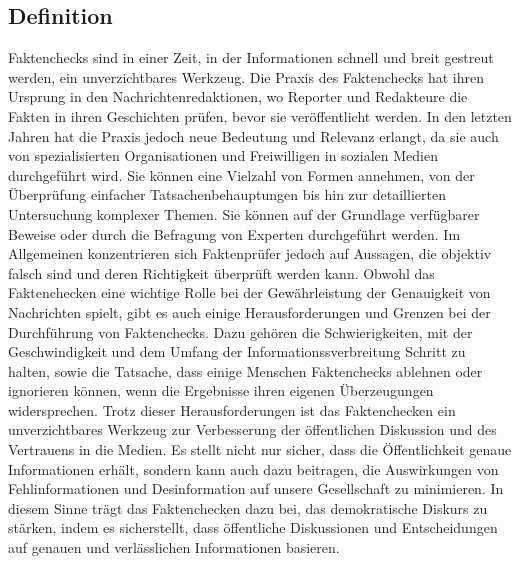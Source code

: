 \documentclass[a4paper,listof=totoc,bibliography=totoc]{scrartcl}
\begin{document}
\subsection{Definition} 
Faktenchecks sind in einer Zeit, in der Informationen schnell und breit gestreut werden, 
ein unverzichtbares Werkzeug. Die Praxis des Faktenchecks hat ihren Ursprung 
in den Nachrichtenredaktionen, wo Reporter und Redakteure die Fakten in ihren Geschichten 
prüfen, bevor sie veröffentlicht werden. In den letzten Jahren hat die Praxis jedoch neue 
Bedeutung und Relevanz erlangt, da sie auch von spezialisierten Organisationen und Freiwilligen 
in sozialen Medien durchgeführt wird.
Sie können eine Vielzahl von Formen annehmen, von der Überprüfung einfacher 
Tatsachenbehauptungen bis hin zur detaillierten Untersuchung komplexer Themen. Sie können 
auf der Grundlage verfügbarer Beweise oder durch die Befragung von Experten durchgeführt werden. 
Im Allgemeinen konzentrieren sich Faktenprüfer jedoch auf Aussagen, die objektiv falsch sind 
und deren Richtigkeit überprüft werden kann.
Obwohl das Faktenchecken eine wichtige Rolle bei der Gewährleistung der Genauigkeit von 
Nachrichten spielt, gibt es auch einige Herausforderungen und Grenzen bei der Durchführung
von Faktenchecks. Dazu gehören die Schwierigkeiten, mit der Geschwindigkeit und dem Umfang 
der Informationssverbreitung Schritt zu halten, sowie die Tatsache, dass einige Menschen 
Faktenchecks ablehnen oder ignorieren können, wenn die Ergebnisse ihren eigenen Überzeugungen 
widersprechen.
Trotz dieser Herausforderungen ist das Faktenchecken ein unverzichtbares Werkzeug zur 
Verbesserung der öffentlichen Diskussion und des Vertrauens in die Medien. 
Es stellt nicht nur sicher, dass die Öffentlichkeit genaue Informationen erhält, sondern 
kann auch dazu beitragen, die Auswirkungen von Fehlinformationen und Desinformation auf 
unsere Gesellschaft zu minimieren. 
In diesem Sinne trägt das Faktenchecken dazu bei, das demokratische Diskurs zu stärken, 
indem es sicherstellt, dass öffentliche Diskussionen und Entscheidungen auf genauen und 
verlässlichen Informationen basieren.
\end{document}
